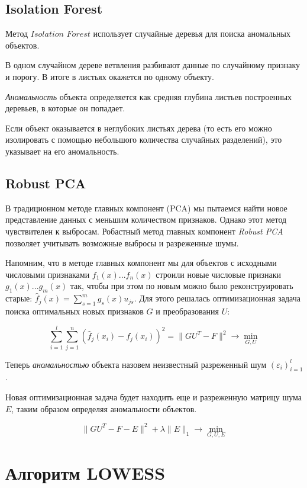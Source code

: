 \subsection{Isolation Forest}

Метод $\textit{Isolation Forest}$ использует случайные деревья для поиска аномальных объектов.

В одном случайном дереве ветвления разбивают данные по случайному признаку и порогу. В итоге в листьях окажется по одному объекту.

\textit{Аномальность} объекта определяется как средняя глубина листьев построенных деревьев, в которые он попадает.

Если объект оказывается в неглубоких листьях дерева (то есть его можно изолировать с помощью небольшого количества случайных разделений), это указывает на его аномальность.

\subsection{Robust PCA}

В традиционном методе главных компонент (PCA) мы пытаемся найти новое представление данных с меньшим количеством признаков. Однако этот метод чувствителен к выбросам. Робастный метод главных компонент \textit{Robust PCA} позволяет учитывать возможные выбросы и разреженные шумы.

Напомним, что в методе главных компонент мы для объектов с исходными числовыми признаками $f_1(x) ... f_n(x)$ строили новые числовые признаки $g_1(x) ... g_m(x)$ так, чтобы при этом по новым можно было реконструировать старые: $\hat{f}_j(x) = \sum_{s=1}^m g_s(x)u_{js}$. Для этого решалась оптимизационная задача поиска оптимальных новых признаков $G$ и преобразования $U$:

$$\sum_{i=1}^l\sum_{j=1}^n (\hat{f}_j(x_i) - f_j(x_i))^2 = \|GU^T - F\|^2 \to \min\limits_{G,U}$$

Теперь \textit{аномальностью} объекта назовем неизвестный разреженный шум $(\varepsilon_i)_{i=1}^l$.

Новая оптимизационная задача будет находить еще и разреженную матрицу шума $E$, таким образом определяя аномальности объектов.

$$\|GU^T - F - E\|^2 + \lambda \|E\|_1 \to \min\limits_{G, U, E}$$

\section{Алгоритм LOWESS}

